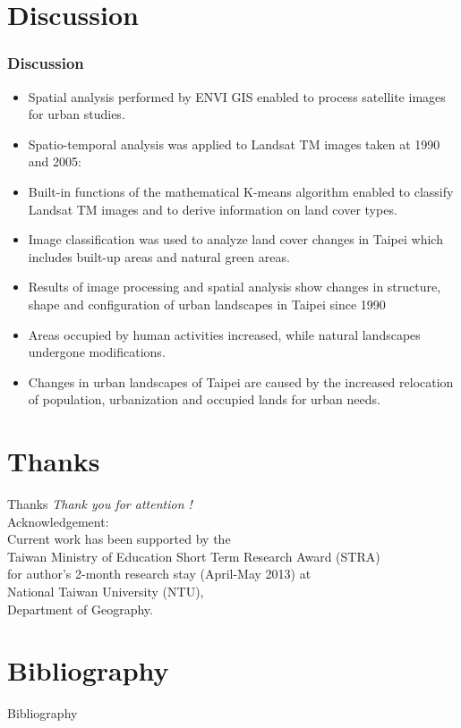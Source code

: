 \documentclass[pdflatex,compress,8pt,
	xcolor={dvipsnames,dvipsnames,svgnames,x11names,table},
	hyperref={colorlinks = true,breaklinks = true, urlcolor = NavyBlue, breaklinks = true}]{beamer}
\begin{document}
\section{Discussion}
\begin{frame}\frametitle{Discussion}
\begin{itemize}
	\item Spatial analysis performed by ENVI GIS enabled to process satellite images for urban studies. 
	\item Spatio-temporal analysis was applied to Landsat TM images taken at 1990 and 2005: 
	\item Built-in functions of the mathematical K-means algorithm enabled to classify Landsat TM images and to derive information on land cover types.
	\item Image classification was used to analyze land cover changes in Taipei which includes built-up areas and natural green areas.
	\item Results of image processing and spatial analysis show changes in structure, shape and configuration of urban landscapes in Taipei since 1990
	\item Areas occupied by human activities increased, while natural landscapes undergone modifications.
	\item Changes in urban landscapes of Taipei are caused by the increased relocation of population, urbanization and occupied lands for urban needs.
\end{itemize}
\end{frame}

\section{Thanks}
\begin{frame}{Thanks}
  	\centering \LARGE 
	\emph{Thank you for attention !}\\
	\vspace{5em}
\normalsize
Acknowledgement: \\
Current work has been supported by the \\
Taiwan Ministry of Education Short Term Research Award (STRA) \\
for author's 2-month research stay (April-May 2013) at\\
National Taiwan University (NTU), \\
Department of Geography.
\end{frame}

\section{Bibliography}
\Large{Bibliography}
\nocite{*}
\printbibliography[heading=none]
	
\end{document}
